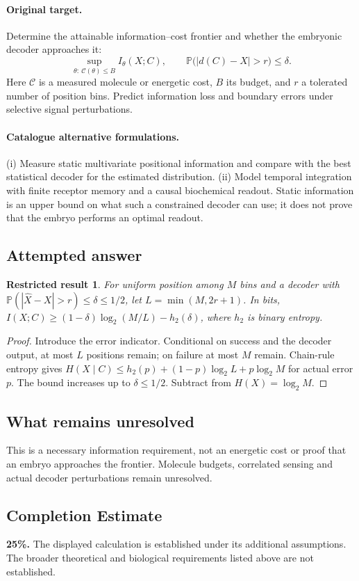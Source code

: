 \documentclass[11pt]{article}
\newcommand{\Prob}{\mathbb P}
\providecommand{\Prob}{\mathbb P}
\newtheorem{attemptresult}{Restricted result}[section]
\begin{document}
\paragraph{Original target.}
Determine the attainable information--cost frontier and whether the embryonic decoder approaches it:
\[
\sup_{\theta:\ \mathcal C(\theta)\leq B} I_\theta(X;C),\qquad
\Prob\bigl(|d(C)-X|>r\bigr)\leq\delta.
\]
Here $\mathcal C$ is a measured molecule or energetic cost, $B$ its budget, and $r$ a tolerated number of position bins. Predict information loss and boundary errors under selective signal perturbations.
\paragraph{Catalogue alternative formulations.}
(i) Measure static multivariate positional information and compare with the best statistical decoder for the estimated distribution. (ii) Model temporal integration with finite receptor memory and a causal biochemical readout. Static information is an upper bound on what such a constrained decoder can use; it does not prove that the embryo performs an optimal readout.
\subsection{Attempted answer}
\begin{attemptresult}
For uniform position among $M$ bins and a decoder with $\Prob(|\widehat X-X|>r)\leq\delta\leq1/2$, let $L=\min(M,2r+1)$. In bits, $I(X;C)\geq(1-\delta)\log_2(M/L)-h_2(\delta)$, where $h_2$ is binary entropy.
\end{attemptresult}
\begin{proof}
Introduce the error indicator. Conditional on success and the decoder output, at most $L$ positions remain; on failure at most $M$ remain. Chain-rule entropy gives $H(X\mid C)\leq h_2(p)+(1-p)\log_2L+p\log_2M$ for actual error $p$. The bound increases up to $\delta\leq1/2$. Subtract from $H(X)=\log_2M$.
\end{proof}
\subsection{What remains unresolved}
This is a necessary information requirement, not an energetic cost or proof that an embryo approaches the frontier. Molecule budgets, correlated sensing and actual decoder perturbations remain unresolved.
\subsection{Completion Estimate}
\textbf{25\%.} The displayed calculation is established under its additional assumptions. The broader theoretical and biological requirements listed above are not established.
\end{document}
